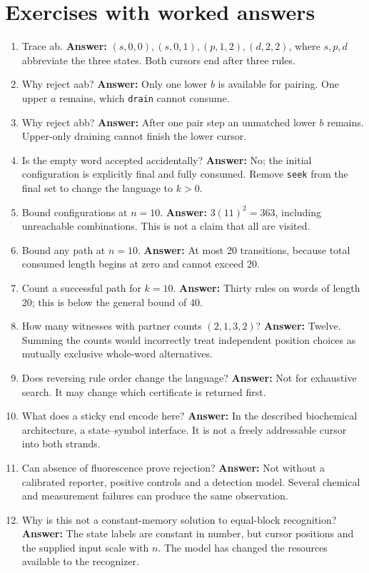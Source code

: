 \section{Exercises with worked answers}
\begin{enumerate}
\item Trace ab. \textbf{Answer:} $(s,0,0),(s,0,1),(p,1,2),(d,2,2)$,
where $s,p,d$ abbreviate the three states. Both cursors end after three rules.
\item Why reject aab? \textbf{Answer:} Only one lower $b$ is available for
pairing. One upper $a$ remains, which \texttt{drain} cannot consume.
\item Why reject abb? \textbf{Answer:} After one pair step an unmatched
lower $b$ remains. Upper-only draining cannot finish the lower cursor.
\item Is the empty word accepted accidentally? \textbf{Answer:} No; the
initial configuration is explicitly final and fully consumed. Remove
\texttt{seek} from the final set to change the language to $k>0$.
\item Bound configurations at $n=10$. \textbf{Answer:} $3(11)^2=363$,
including unreachable combinations. This is not a claim that all are visited.
\item Bound any path at $n=10$. \textbf{Answer:} At most 20 transitions,
because total consumed length begins at zero and cannot exceed 20.
\item Count a successful path for $k=10$. \textbf{Answer:} Thirty rules
on words of length 20; this is below the general bound of 40.
\item How many witnesses with partner counts $(2,1,3,2)$?
\textbf{Answer:} Twelve. Summing the counts would incorrectly treat independent
position choices as mutually exclusive whole-word alternatives.
\item Does reversing rule order change the language? \textbf{Answer:} Not
for exhaustive search. It may change which certificate is returned first.
\item What does a sticky end encode here? \textbf{Answer:} In the described
biochemical architecture, a state--symbol interface. It is not a freely
addressable cursor into both strands.
\item Can absence of fluorescence prove rejection? \textbf{Answer:} Not
without a calibrated reporter, positive controls and a detection model.
Several chemical and measurement failures can produce the same observation.
\item Why is this not a constant-memory solution to equal-block recognition?
\textbf{Answer:} The state labels are constant in number, but cursor positions
and the supplied input scale with $n$. The model has changed the resources
available to the recognizer.
\end{enumerate}

